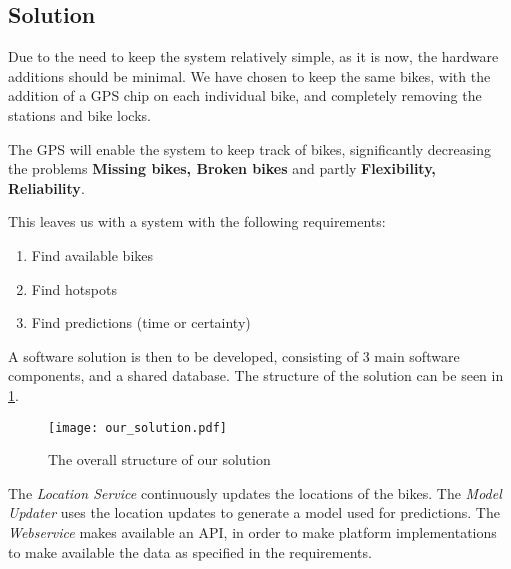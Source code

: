 \subsection{Solution}
Due to the need to keep the system relatively simple, as it is now, the hardware additions should be minimal.
We have chosen to keep the same bikes, with the addition of a GPS chip on each individual bike, and completely removing the stations and bike locks.

The GPS will enable the system to keep track of bikes, significantly decreasing the problems \textbf{Missing bikes, Broken bikes} and partly \textbf{Flexibility, Reliability}.

This leaves us with a system with the following requirements:
\begin{enumerate}
\item Find available bikes
\item Find hotspots
\item Find predictions (time or certainty)
\end{enumerate}

A software solution is then to be developed, consisting of 3 main software components, and a shared database.
The structure of the solution can be seen in \cref{fig:solution_structure}.

\begin{figure}[h]
\texttt{[image: our\_solution.pdf]}
\caption{The overall structure of our solution}
\label{fig:solution_structure}
\end{figure}

The \textit{Location Service} continuously updates the locations of the bikes.
The \textit{Model Updater} uses the location updates to generate a model used for predictions.
The \textit{Webservice} makes available an API, in order to make platform implementations to make available the data as specified in the requirements.
